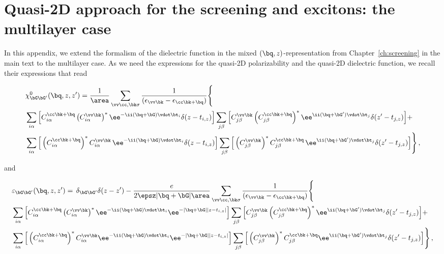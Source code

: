 
%


\chapter{Quasi-2D approach for the screening and excitons: the multilayer case}
\label{app:Q2D_multilayer}
\glsresetall

In this appendix, we extend the formalism of the dielectric function in the mixed $(\bq,z)$-representation from Chapter~\ref{ch:screening} in the main text to the multilayer case.
As we need the expressions for the quasi-2D polarizability and the quasi-2D dielectric function, we recall their expressions that read

\begin{align}
    &\chi^{0}_{\bG \bG'}(\bq,z,z') =  \frac{1}{\area}\sum_{\vv \cc,\bk \sigma} \frac{1}{( \epsilon_{\vv\bk}-\epsilon_{\cc\bk+\bq })}\Bigg\{ \label{eq:mixed_polarizability_appendix}\\
    &\sum_{i\alpha}\Big[C_{i\alpha}^{\cc\bk+\bq }\left(C_{i\alpha}^{\vv\bk}\right)^{*} \ee^{-\ii (\bq +\bG) \vdot\bt_{i}} \delta(z - t_{i,z}) \Big] \sum_{j\beta}\Big[C_{j\beta}^{\vv\bk}\left(C_{j\beta}^{\cc\bk+\bq }\right)^{*} \ee^{\ii (\bq +\bG') \vdot \bt_{j}} \delta(z' - t_{j,z}) \Big] + \notag\\
    &\sum_{i\alpha}\Big[\left(C_{i\alpha}^{\cc\bk+\bq }\right)^{*}C_{i\alpha}^{\vv\bk}\, \ee^{-\ii (\bq +\bG) \vdot\bt_{i}} \delta(z - t_{i,z}) \Big] \sum_{j\beta} \Big[\left(C_{j\beta}^{\vv\bk}\right)^{*}C_{j\beta}^{\cc\bk+\bq }\, \ee^{\ii (\bq +\bG') \vdot \bt_{j}} \delta(z' - t_{j,z})\Big]\Bigg\}\,, \notag
\end{align}

\noindent and 

\begin{align}
    \label{eq:quasi_2D_dielectric_function_final_appendix}
    & \varepsilon_{\bG \bG'}(\bq,z,z') = \,\delta_{\bG \bG'} \delta( z-z')-\frac{e}{2\epsz |\bq +\bG|\area}\sum_{\vv \cc, \bk \sigma}\frac{1}{( \epsilon_{\vv\bk}-\epsilon_{\cc\bk+\bq })}\Bigg\{\\
    & \sum_{i\alpha} \Big[C_{i\alpha}^{\cc \bk+\bq} \left(C_{i\alpha}^{\vv\bk}\right)^{*} \ee^{-\ii (\bq +\bG) \vdot\bt_{i}} \ee^{-|\bq +\bG||z-t_{i,z}|}\Big] \sum_{j\beta}\Big[C_{j\beta}^{\vv\bk}\left(C_{j\beta}^{\cc\bk+\bq }\right)^{*} \ee^{\ii (\bq +\bG') \vdot \bt_{j}} \delta(z' - t_{j,z})\Big]+  \notag\\
    & \sum_{i\alpha} \Big[\left(C_{i\alpha}^{\cc\bk+\bq }\right)^{*}C_{i\alpha}^{\vv\bk} \ee^{-\ii (\bq +\bG) \vdot\bt_{i}} \ee^{-|\bq +\bG||z-t_{i,z}|}\Big] \sum_{j\beta}\Big[\left(C_{j\beta}^{\vv\bk}\right)^{*}C_{j\beta}^{\cc\bk+\bq } \ee^{\ii (\bq +\bG') \vdot \bt_{j}} \delta(z' - t_{j,z})\Big]\Bigg\} \,, \notag
\end{align}

